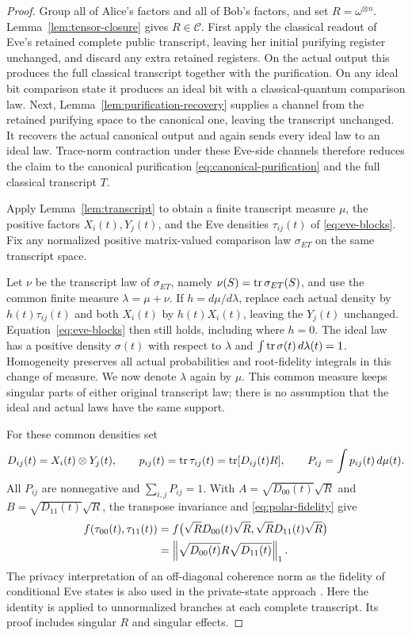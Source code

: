 \begin{proof}
Group all of Alice's factors and all of Bob's factors, and set
$R=\omega^{\otimes n}$.  Lemma~\ref{lem:tensor-closure} gives
$R\in\mathscr C$.  First apply the classical readout of Eve's retained
complete public transcript, leaving her initial purifying register
unchanged, and discard any extra retained registers.  On the actual output
this produces the full classical transcript together with the purification.
On any ideal bit comparison state it produces an ideal bit with a
classical-quantum comparison law.  Next,
Lemma~\ref{lem:purification-recovery} supplies a channel from the retained
purifying space to the canonical one, leaving the transcript unchanged.
It recovers the actual canonical output and again sends every ideal law
to an ideal law.  Trace-norm contraction under these Eve-side channels
therefore reduces the claim to the canonical purification
\eqref{eq:canonical-purification} and the full classical transcript $T$.

Apply Lemma~\ref{lem:transcript} to obtain a finite transcript measure
$\mu$, the positive factors $X_i(t),Y_j(t)$, and the Eve densities
$\tau_{ij}(t)$ of \eqref{eq:eve-blocks}.  Fix any normalized positive
matrix-valued comparison law $\sigma_{ET}$ on the same transcript space.

Let $\nu$ be the transcript law of $\sigma_{ET}$, namely
$\nu(S)=\operatorname{tr}\sigma_{ET}(S)$, and use the common finite measure
$\lambda=\mu+\nu$.  If $h=d\mu/d\lambda$, replace each actual density
by $h(t)\tau_{ij}(t)$ and both $X_i(t)$ by $h(t)X_i(t)$, leaving the
$Y_j(t)$ unchanged.  Equation~\eqref{eq:eve-blocks} then still holds,
including where $h=0$.  The ideal law has a positive density
$\sigma(t)$ with respect to $\lambda$ and
$\int\operatorname{tr}\sigma(t)\,d\lambda(t)=1$.  Homogeneity preserves all actual
probabilities and root-fidelity integrals in this change of measure.
We now denote $\lambda$ again by $\mu$.  This common measure keeps
singular parts of either original transcript law; there is no
assumption that the ideal and actual laws have the same support.

For these common densities set
\[
 D_{ij}(t)=X_i(t)\otimes Y_j(t),\qquad
 p_{ij}(t)=\operatorname{tr}\tau_{ij}(t)=\operatorname{tr}[D_{ij}(t)R],\qquad
 P_{ij}=\int p_{ij}(t)\,d\mu(t).
\]
All $P_{ij}$ are nonnegative and $\sum_{i,j}P_{ij}=1$.  With
$A=\sqrt{D_{00}(t)}\sqrt R$ and
$B=\sqrt{D_{11}(t)}\sqrt R$, the transpose invariance and
\eqref{eq:polar-fidelity} give
\begin{equation}\label{eq:transcript-fidelity}
 \begin{aligned}
 f(\tau_{00}(t),\tau_{11}(t))
 &=f\bigl(\sqrt R D_{00}(t)\sqrt R,
           \sqrt R D_{11}(t)\sqrt R\bigr)\\
 &=\left\lVert\sqrt{D_{00}(t)}R\sqrt{D_{11}(t)}\right\rVert_1.
 \end{aligned}
\end{equation}
The privacy interpretation of an off-diagonal coherence norm as the
fidelity of conditional Eve states is also used in the private-state
approach \cite[Eq.~(7)]{keyBoundEntanglement}.  Here the identity is
applied to unnormalized branches at each complete transcript.  Its
proof includes singular $R$ and singular effects.


\end{proof}
